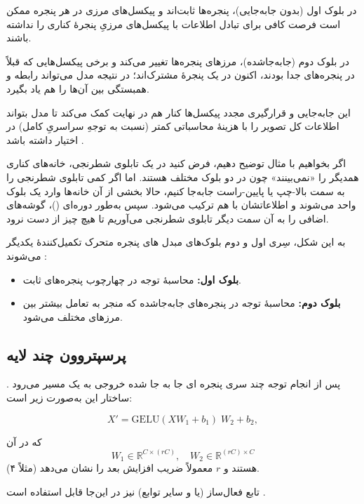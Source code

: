 در بلوک اول (بدون جابه‌جایی)، پنجره‌ها ثابت‌اند و پیکسل‌های مرزی در هر پنجره ممکن است فرصت کافی برای تبادل اطلاعات با پیکسل‌های مرزیِ پنجرهٔ کناری را نداشته باشند.

در بلوک دوم (جابه‌جاشده)، مرزهای پنجره‌ها تغییر می‌کند و برخی پیکسل‌هایی که قبلاً در پنجره‌های جدا بودند، اکنون در یک پنجرهٔ مشترک‌اند؛ در نتیجه مدل می‌تواند رابطه و همبستگی بین آن‌ها را هم یاد بگیرد.

این جابه‌جایی و قرارگیری مجدد پیکسل‌ها کنار هم در نهایت کمک می‌کند تا مدل بتواند اطلاعات کل تصویر را با هزینهٔ محاسباتی کمتر (نسبت به توجهِ سراسریِ کامل) در اختیار داشته باشد \cite{liu2021swintransformer}.

اگر بخواهیم با مثال توضیح دهیم، فرض کنید در یک تابلوی شطرنجی، خانه‌های کناری همدیگر را «نمی‌بینند» چون در دو بلوک مختلف هستند.
اما اگر کمی تابلوی شطرنجی را به سمت بالا-چپ یا پایین-راست جابه‌جا کنیم،
حالا بخشی از آن خانه‌ها وارد یک بلوک واحد می‌شوند و اطلاعاتشان با هم ترکیب می‌شود.
سپس به‌طور دوره‌ای (\textit{})، گوشه‌های اضافی را به آن سمت دیگر تابلوی شطرنجی می‌آوریم
تا هیچ چیز از دست نرود.

به این شکل، سِری اول و دوم بلوک‌های مبدل های پنجره متحرک 
تکمیل‌کنندهٔ یکدیگر می‌شوند \cite{liu2021swintransformer}:
\begin{itemize}
	\item \textbf{بلوک اول:} محاسبهٔ توجه در چهارچوب پنجره‌های ثابت.
	\item \textbf{بلوک دوم:} محاسبهٔ  توجه در پنجره‌های جابه‌جاشده که منجر به تعامل بیشتر بین مرزهای مختلف می‌شود.
\end{itemize}


\subsection{پرسپتروون چند لایه}
پس از انجام توجه چند سری پنجره ای جا  به جا شده 
خروجی به یک مسیر \textbf{} می‌رود \cite{liu2021swintransformer}. ساختار این  به‌صورت زیر است:

\begin{equation}
	X' = \mathrm{GELU}(X W_1 + b_1) \; W_2 + b_2,
	\label{eq:gelu_transform}
\end{equation}

که در آن
\[
W_1 \in \mathbb{R}^{C \times (rC)}, 
\quad
W_2 \in \mathbb{R}^{(rC) \times C}
\]
هستند و \(\displaystyle r\) معمولاً ضریب افزایش بعد را نشان می‌دهد (مثلاً ۴). 

تابع فعال‌ساز  (یا  و سایر توابع) نیز در این‌جا قابل استفاده است \cite{hendrycks2016gelu}.

